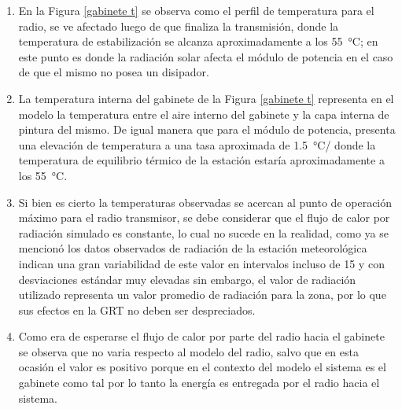 \begin{enumerate}
    \item En la Figura \ref{gabinete t} se observa como el perfil de temperatura para el radio, se ve afectado luego de que finaliza la transmisión, donde la temperatura de estabilización se alcanza aproximadamente a los \SI{55}{\celsius}; en este punto es donde la radiación solar afecta el módulo de potencia en el caso de que el mismo no posea un disipador.
    \item La temperatura interna del gabinete de la Figura \ref{gabinete t} representa en el modelo la temperatura entre el aire interno del gabinete y la capa interna de pintura del mismo. De igual manera que para el módulo de potencia, presenta una elevación de temperatura a una tasa aproximada de \SI{1,5}{\celsius/\min} donde la temperatura de equilibrio térmico de la estación estaría aproximadamente a los \SI{55}{\celsius}.
    \item Si bien es cierto la temperaturas observadas se acercan al punto de operación máximo para el radio transmisor, se debe considerar que el flujo de calor por radiación simulado es constante, lo cual no sucede en la realidad, como ya se mencionó los datos observados de radiación de la estación meteorológica indican una gran variabilidad de este valor en intervalos incluso de \SI{15}{\min} y con desviaciones estándar muy elevadas sin embargo, el valor de radiación utilizado representa un valor promedio de radiación para la zona, por lo que sus efectos en la GRT no deben ser despreciados.
    \item Como era de esperarse el flujo de calor por parte del radio hacia el gabinete se observa que no varia respecto al modelo del radio, salvo que en esta ocasión el valor es positivo porque en el contexto del modelo el sistema es el gabinete como tal por lo tanto la energía es entregada por el radio hacia el sistema.
\end{enumerate}

